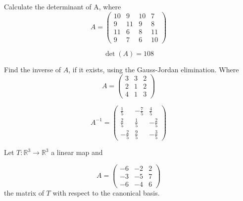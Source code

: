 
\begin{center}
\end{center}

\begin{questions}

\question Calculate the determinant of A, where
$$
A=\left(\begin{array}{rrrr}
10 & 9 & 10 & 7 \\
9 & 11 & 9 & 8 \\
11 & 6 & 8 & 11 \\
9 & 7 & 6 & 10
\end{array}\right)
$$

\begin{solution}
$$\det(A)=108$$
\end{solution}

\question Find the inverse of $A$, if it exists, using the Gauss-Jordan elimination. Where
$$
A=\left(\begin{array}{rrr}
3 & 3 & 2 \\
2 & 1 & 2 \\
4 & 1 & 3
\end{array}\right)
$$

\begin{solution}
$$A^{-1}=\left(\begin{array}{rrr}
\frac{1}{5} & -\frac{7}{5} & \frac{4}{5} \\
\frac{2}{5} & \frac{1}{5} & -\frac{2}{5} \\
-\frac{2}{5} & \frac{9}{5} & -\frac{3}{5}
\end{array}\right)$$
\end{solution}

\question Let $T:\mathbb{R}^3\rightarrow\mathbb{R}^3$  a linear map and
 
$$
A=\left(\begin{array}{rrr}
-6 & -2 & 2 \\
-3 & -5 & 7 \\
-6 & -4 & 6
\end{array}\right)
$$
the matrix of $T$ with respect to the canonical basis.
\end{questions}
